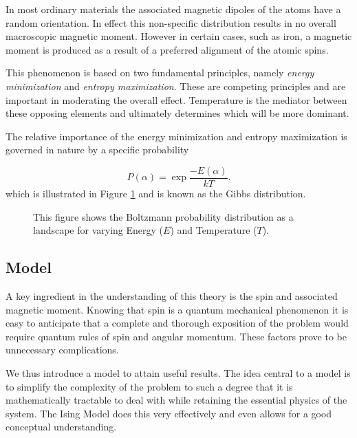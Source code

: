 \documentclass[a4paper]{article}
\begin{document}
In most ordinary materials the associated magnetic dipoles of the atoms have a
random orientation. In effect this non-specific distribution results
in no overall macroscopic magnetic moment. However in certain cases,
such as iron, a magnetic moment is produced as a result of a preferred
alignment of the atomic spins. 

This phenomenon is based on two fundamental principles, namely \emph{energy
minimization} and \emph{entropy maximization}. These are competing 
principles and are important in moderating the overall effect.
Temperature is the mediator between these opposing elements
and ultimately determines which will be more dominant.

The relative importance of the energy minimization and entropy maximization is
governed in nature by a specific probability

\begin{equation}
P(\alpha)=\exp{\frac{-E(\alpha)}{kT}}\label{eq:boltzmann}.
\end{equation}
which is illustrated in Figure \ref{fig:prob} and is known as the Gibbs
distribution. 
\begin{figure}[hbt]
  \centering
  \caption{This figure shows the Boltzmann probability distribution as a landscape for varying Energy ($E$) and Temperature ($T$).}\label{fig:prob}
\end{figure}

\subsection{Model}

A key ingredient in the understanding of this theory is the spin and
associated magnetic moment. Knowing that spin is a quantum mechanical
phenomenon it is easy to anticipate that a complete and thorough
exposition of the problem would require quantum rules of spin and angular 
momentum. These factors prove to be unnecessary complications.

We thus introduce a model to attain
 useful results. The idea central to a
model is to simplify the complexity of the problem to such a degree 
that it
is mathematically tractable to deal with while retaining the
essential physics of the system. The Ising Model does this very
effectively and even allows for a good conceptual understanding.
\end{document}
